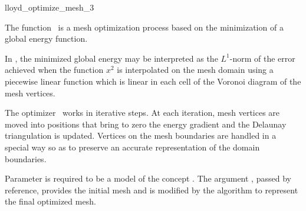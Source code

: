 \ccRefPageBegin


\begin{ccRefFunction}{lloyd_optimize_mesh_3}  %


\ccDefinition
  
The function \ccRefName\ is a mesh optimization process
based on the minimization of a global energy function.

In \ccRefName, the minimized global energy may be interpreted
as the $L^1$-norm of the error achieved 
when  the function $x^2$ is interpolated on the  mesh domain
using a piecewise linear function which is linear 
 in  each cell of the Voronoi diagram of  the mesh vertices.

The optimizer \ccRefName\  works in iterative steps.
At each iteration,  mesh vertices are moved into 
positions that bring to zero the energy gradient
and the Delaunay triangulation is updated.
Vertices on the mesh boundaries are handled
in a special way so as to preserve an accurate
representation of the domain boundaries.




\ccParameters

Parameter  is required to be a model of the concept
.
The argument , passed by
reference, provides the initial mesh  
and is modified  by the algorithm 
to represent the final optimized mesh.


\end{ccRefFunction}
